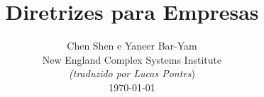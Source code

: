 \documentclass[onecolumn,journal]{IEEEtran}
\begin{document}
\title{\color{Brown}  Diretrizes para Empresas
\vspace{-0.35ex}}
\author{Chen Shen e Yaneer Bar-Yam \\ New England Complex Systems Institute \\
\vspace{+0.35ex}
\small{\textit{(traduzido por Lucas Pontes})}\\
 \today
  \vspace{-8ex} \\
\textbf{}
 }

\maketitle




\thispagestyle{empty} %





\end{document}
